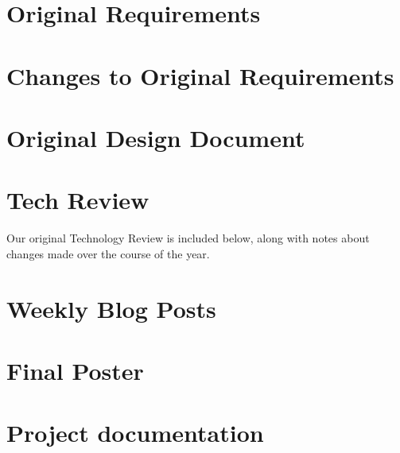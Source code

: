 \documentclass[10pt,draftclsnofoot,onecolumn]{IEEEtran}
\begin{document}
\newpage
\section{Original Requirements} %

\newpage
\section{Changes to Original Requirements} %

\newpage
\section{Original Design Document} %

\newpage
\section{Tech Review} %
Our original Technology Review is included below, along with notes about changes made over the course of the year.


\newpage
\section{Weekly Blog Posts} %


\newpage
\section{Final Poster} %

\newpage
\section{Project documentation} %
\end{document}
